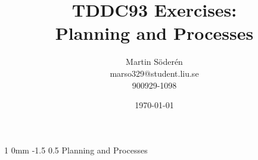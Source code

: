 \documentclass[a4paper,11pt]{article}
\makeatletter
\renewcommand{\section}{\@startsection
   {section}%
   {1}%
   {0mm}%
   {-1.5\baselineskip}%
   {0.5\baselineskip}%
   {\sffamily\bfseries\upshape\normalsize}}%
\makeatother
\begin{document}
\begin{titlepage}
\title{TDDC93 Exercises:\\
Planning and Processes}
\author{Martin Söderén\\ marso329@student.liu.se\\900929-1098}
\date{\today}
\maketitle




\vfill %

\thispagestyle{empty}

\end{titlepage}
\section{Planning and Processes}
\end{document}
